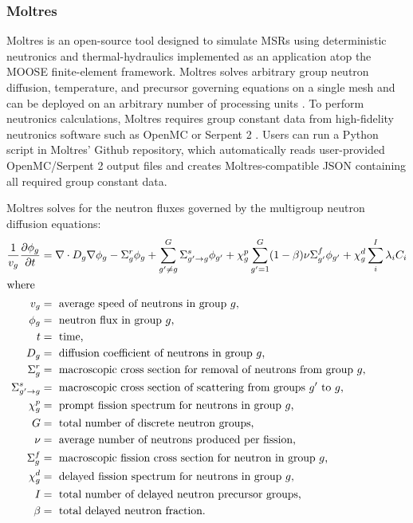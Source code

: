 \subsubsection{Moltres}
Moltres is an open-source tool designed to simulate \glspl{MSR} using 
deterministic neutronics and thermal-hydraulics implemented as an application 
atop the \gls{MOOSE} finite-element framework.  
Moltres solves arbitrary group neutron diffusion, temperature, and precursor 
governing equations on a single mesh and can be deployed on an arbitrary number 
of processing units \cite{lindsay_introduction_2018}.
To perform neutronics calculations, Moltres requires group constant data from 
high-fidelity neutronics software such as OpenMC \cite{romano_openmc:_2015} or 
Serpent 2 \cite{leppanen_serpent_2014}. 
Users can run a Python script in Moltres' Github repository, which automatically reads
user-provided OpenMC/Serpent 2 output files and creates Moltres-compatible JSON 
containing all required group constant data.

Moltres solves for the neutron fluxes governed by the multigroup neutron diffusion 
equations:
\begin{align}
    \label{eq:moltres-diffusion-equation}
    \frac{1}{v_g} \frac{\partial \phi_g}{\partial t} &= \nabla \cdot D_g
    \nabla \phi_g - \Sigma^r_g \phi_g +
    \sum^G_{g' \neq g} \Sigma^s_{g' \rightarrow g} \phi_{g'} + \chi^p_g
    \sum^G_{g'=1} (1-\beta) \nu \Sigma^f_{g'} \phi_{g'} + \chi^d_g \sum^I_i
    \lambda_i C_i \\
    \intertext{where}
    v_g &= \text{ average speed of neutrons in group $g$,} \nonumber \\
    \phi_g &= \text{ neutron flux in group $g$,}\nonumber \\
    t &= \text{ time,} \nonumber \\
    D_g &= \text{ diffusion coefficient of neutrons in group $g$,} \nonumber \\
    \Sigma^r_g &= \text{ macroscopic cross section for removal of neutrons from group $g$,} \nonumber \\
    \Sigma^s_{g' \rightarrow g} &= \text{ macroscopic cross section of scattering from groups $g'$ to $g$,} \nonumber \\
    \chi^p_g &= \text{ prompt fission spectrum for neutrons in group $g$,} \nonumber \\
    G &= \text{ total number of discrete neutron groups,} \nonumber \\
    \nu &= \text{ average number of neutrons produced per fission,} \nonumber \\
    \Sigma^f_{g} &= \text{ macroscopic fission cross section for neutron in group $g$,} \nonumber \\
    \chi^d_g &= \text{ delayed fission spectrum for neutrons in group $g$,} \nonumber \\
    I &= \text{ total number of delayed neutron precursor groups,} \nonumber \\
    \beta &= \text{ total delayed neutron fraction.} \nonumber
\end{align}

